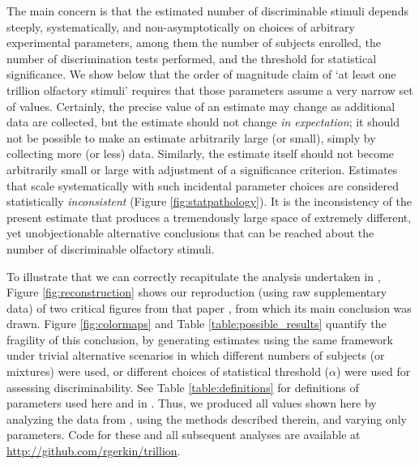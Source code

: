 \documentclass[letterpaper,twocolumn,10pt]{article}
\begin{document}
The main concern is that the estimated number of discriminable stimuli depends steeply, systematically, and non-asymptotically on choices of arbitrary experimental parameters, 
among them the number of subjects enrolled, the number of discrimination tests performed, and the threshold for statistical significance.  
We show below that the order of magnitude claim of `at least one trillion olfactory stimuli' requires that those parameters assume a very narrow set of values. 
Certainly, the precise value of an estimate may change as additional data are collected, 
but the estimate should not change \textit{in expectation}; it should not be possible to make an estimate arbitrarily large (or small), 
simply by collecting more (or less) data. Similarly, the estimate itself should not become arbitrarily small or large with adjustment of a significance criterion. Estimates that scale systematically with such incidental parameter choices are considered statistically \textit{inconsistent} (Figure \ref{fig:statpathology}). It is the inconsistency of the present estimate that produces a tremendously large space of extremely different, yet unobjectionable alternative conclusions that can be reached about the number of discriminable olfactory stimuli. 

To illustrate that we can correctly recapitulate the analysis undertaken in \cite{bushdid_humans_2014}, 
Figure \ref{fig:reconstruction} shows our reproduction (using raw supplementary data) of two critical figures from that paper \cite{bushdid_humans_2014}, from which its main conclusion was drawn. 
Figure \ref{fig:colormaps} and Table \ref{table:possible_results} quantify the fragility of this conclusion, 
by generating estimates using the same framework under trivial alternative scenarios in which different numbers of subjects (or mixtures) were used, 
or different choices of statistical threshold ($\alpha$) were used for assessing discriminability. 
See Table \ref{table:definitions} for definitions of parameters used here and in \cite{bushdid_humans_2014}.  
Thus, we produced all values shown here by analyzing the data from \cite{bushdid_humans_2014}, using the methods described therein, and varying only parameters. 
Code for these and all subsequent analyses are available at \url{http://github.com/rgerkin/trillion}. 
\end{document}
